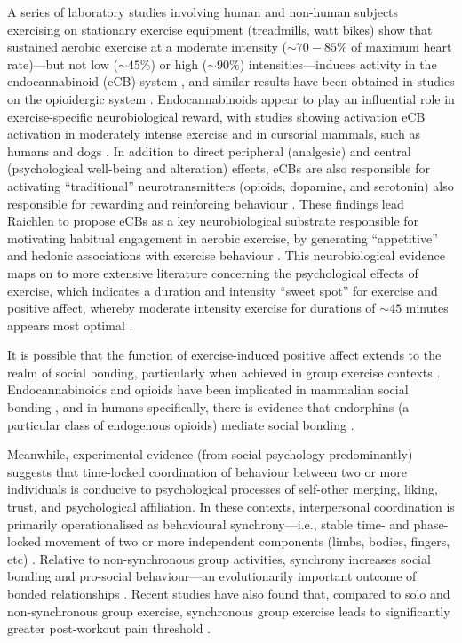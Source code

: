 \begin{CJK}{UTF8}{gbsn}
A series of laboratory studies involving human and non-human subjects exercising on stationary exercise equipment (treadmills, watt bikes) show that sustained aerobic exercise at a moderate intensity ($\sim70-85\%$ of maximum heart rate)---but not low ($\sim45\%$) or high ($\sim90\%$) intensities---induces activity in the endocannabinoid (eCB) system \citep{Raichlen2013}, and similar results have been obtained in studies on the opioidergic system \citep{Boecker2008}.  Endocannabinoids appear to play an influential role in exercise-specific neurobiological reward, with studies showing activation eCB activation in moderately intense exercise and in cursorial mammals, such as humans and dogs \citep[but not non-cursorial mammals, e.g., ferrets;][]{Raichlen2012}.  In addition to direct peripheral (analgesic) and central (psychological well-being and alteration) effects, eCBs are also responsible for activating ``traditional'' neurotransmitters (opioids, dopamine, and serotonin) also responsible for rewarding and reinforcing behaviour \citep{Sparling2003}.  These findings lead Raichlen to propose eCBs as a key neurobiological substrate responsible for motivating habitual engagement in aerobic exercise, by generating ``appetitive'' and hedonic associations with exercise behaviour \citep{Raichlen2012}.  This neurobiological evidence maps on to more extensive literature concerning the psychological effects of exercise, which indicates a duration and intensity ``sweet spot'' for exercise and positive affect, whereby moderate intensity exercise for durations of $\sim45$ minutes appears most optimal \citep{Reed2006}.

It is possible that the function of exercise-induced positive affect extends to the realm of social bonding, particularly when achieved in group exercise contexts \citep{Cohen2009,Machin2011}.  Endocannabinoids and opioids have been implicated in mammalian social bonding \citep{Fattore2010,Keverne1989}, and in humans specifically, there is evidence that endorphins (a particular class of endogenous opioids) mediate social bonding \citep{Dunbar2012,Shultz2010}.

Meanwhile, experimental evidence (from social psychology predominantly) suggests that time-locked coordination of behaviour between two or more individuals is conducive to psychological processes of self-other merging, liking, trust, and psychological affiliation.  In these contexts, interpersonal coordination is primarily operationalised as behavioural synchrony---i.e., stable time- and phase-locked movement of two or more independent components (limbs, bodies, fingers, etc) \citep{Pikovsky2007}.  Relative to non-synchronous group activities, synchrony increases social bonding and pro-social behaviour---an evolutionarily important outcome of bonded relationships \citep{Reddish2013,Reddish2013a,Wiltermuth2009}.  Recent studies have also found that, compared to solo and non-synchronous group exercise, synchronous group exercise leads to significantly greater post-workout pain threshold \citep{Cohen2009,Sullivan2014,Sullivan2013a, Sullivan2013b}.


\end{CJK}
